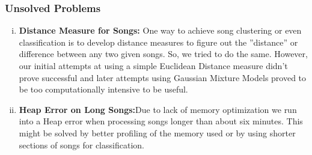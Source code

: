 \subsubsection{Unsolved Problems}
\begin{enumerate}[(i)]
        \item \textbf{Distance Measure for Songs:} One way to achieve song clustering or even classification is to develop distance measures to figure out the ''distance'' or difference between any two given songs. So, we tried to do the same. However, our initial attempts at using a simple Euclidean Distance measure didn’t prove successful and later attempts using Gaussian Mixture Models proved to be too computationally intensive to be useful. 
        \item \textbf{Heap Error on Long Songs:}Due to lack of memory optimization we run into a Heap error when processing songs longer than about six minutes. This might be solved by better profiling of the memory used or by using shorter sections of songs for classification.
\end{enumerate}


